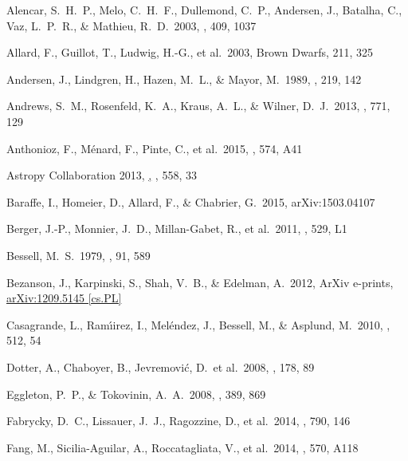 \documentclass{aastex6}
\begin{document}
\begin{thebibliography}{}

 Alencar, S.~H.~P., Melo, C.~H.~F., Dullemond, C.~P., Andersen, J., Batalha, C., Vaz, L.~P.~R., \& Mathieu, R.~D.\ 2003, \aap, 409, 1037

 Allard, F., Guillot, T.,
Ludwig, H.-G., et al.\ 2003, Brown Dwarfs, 211, 325

 Andersen, J., Lindgren, H., Hazen, M.~L., \& Mayor, M.\ 1989, \aap, 219, 142

 Andrews, S.~M., Rosenfeld, K.~A., Kraus, A.~L., \& Wilner, D.~J.\ 2013, \apj, 771, 129

 Anthonioz, F., M{\'e}nard, F., Pinte, C., et al.\ 2015, \aap, 574, A41

 Astropy Collaboration 2013,
  \href{http://dx.doi.org/10.1051/0004-6361/201322068}, \aap,
  558, 33

 Baraffe, I., Homeier, D., Allard, F., \& Chabrier, G.\ 2015, arXiv:1503.04107

 Berger, J.-P., Monnier, J.~D., Millan-Gabet, R., et al.\ 2011, \aap, 529, L1

 Bessell, M.~S.\ 1979, \pasp, 91, 589

 Bezanson, J., Karpinski, S., Shah, V.~B., \& Edelman, A.\ 2012, ArXiv e-prints,
  \href{http://arxiv.org/abs/1209.5145}{{\sffamily arXiv:1209.5145 [cs.PL]}}

 Casagrande, L., Ram{\'{\i}}irez, I., Mel{\'e}ndez, J., Bessell, M., \& Asplund, M.\ 2010, \aap, 512, 54

 Dotter, A., Chaboyer, B., Jevremovi{\'c}, D.\ et al.\ 2008, \apjs, 178, 89

 Eggleton, P.~P., \& Tokovinin, A.~A.\ 2008, \mnras, 389, 869


 Fabrycky, D.~C., Lissauer, J.~J., Ragozzine, D., et al.\ 2014, \apj, 790, 146

 Fang, M., Sicilia-Aguilar, A., Roccatagliata, V., et al.\ 2014, \aap, 570, A118


\end{thebibliography}
\end{document}
